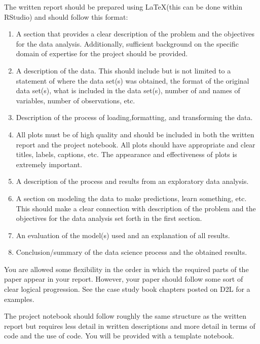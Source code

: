 \documentclass[12pt]{article}
\begin{document}
The written report should be prepared using \LaTeX (this can be done within RStudio) and should follow this format:
\begin{enumerate}
    \item A section that provides a clear description of the problem and the objectives for the data analysis. Additionally, sufficient background on the specific domain of expertise for the project should be provided.
    \item A description of the data. This should include but is not limited to a statement of where the data set(s) was obtained, the format of the original data set(s), what is included in the data set(s), number of and names of variables, number of observations, etc.
    \item Description of the process of loading,formatting, and transforming the data.
    \item All plots must be of high quality and should be included in both the written report and the project notebook. All plots should have appropriate and clear titles, labels, captions, etc. The appearance and effectiveness of plots is extremely important.
    \item A description of the process and results from an exploratory data analysis.
    \item A section on modeling the data to make predictions, learn something, etc. This should make a clear connection with description of the problem and the objectives for the data analysis set forth in the first section.
    \item An evaluation of the model(s) used and an explanation of all results.
    \item Conclusion/summary of the data science process and the obtained results.
\end{enumerate}
You are allowed some flexibility in the order in which the required parts of the paper appear in your report. However, your paper should follow some sort of clear logical progression. See the case study book chapters posted on D2L for a examples.

The project notebook should follow roughly the same structure as the written report but requires less detail in written descriptions and more detail in terms of code and the use of code. You will be provided with a template notebook.
\end{document}
